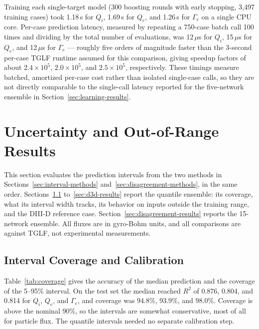 \documentclass[12pt,letterpaper]{article}
\begin{document}
Training each single-target model (300 boosting rounds with early stopping,
3,497 training cases) took 1.18\,s for $Q_i$, 1.69\,s for $Q_e$, and 1.26\,s
for $\Gamma_e$ on a single CPU core. Per-case prediction latency, measured by
repeating a 750-case batch call 100 times and dividing by the total number of
evaluations, was 12\,$\mu$s for $Q_i$, 15\,$\mu$s for $Q_e$, and 12\,$\mu$s for
$\Gamma_e$ --- roughly five orders of magnitude faster than the 3-second
per-case TGLF runtime assumed for this comparison, giving speedup factors of
about $2.4\times10^5$, $2.0\times10^5$, and $2.5\times10^5$, respectively.
These timings measure batched, amortized per-case cost rather than isolated
single-case calls, so they are not directly comparable to the single-call
latency reported for the five-network ensemble in
Section~\ref{sec:learning-results}.

\section{Uncertainty and Out-of-Range Results}
\label{sec:uncertainty-results}

This section evaluates the prediction intervals from the two methods in
Sections~\ref{sec:interval-methods} and~\ref{sec:disagreement-methods}, in the
same order. Sections~\ref{sec:coverage-results} to~\ref{sec:d3d-results}
report the quantile ensemble: its coverage, what its interval
width tracks, its behavior on inputs outside the training range, and the
DIII-D reference case. Section~\ref{sec:disagreement-results} reports the
15-network ensemble. All fluxes are in gyro-Bohm units, and all
comparisons are against TGLF, not experimental measurements.

\subsection{Interval Coverage and Calibration}
\label{sec:coverage-results}

Table~\ref{tab:coverage} gives the accuracy of the median prediction and the
coverage of the 5--95\% interval. On the test set the median reached $R^2$ of
0.876, 0.804, and 0.814 for $Q_i$, $Q_e$, and $\Gamma_e$, and coverage was
94.8\%, 93.9\%, and 98.0\%. Coverage is above the nominal 90\%, so the
intervals are somewhat conservative, most of all for particle flux. The
quantile intervals needed no separate calibration step.
\end{document}
